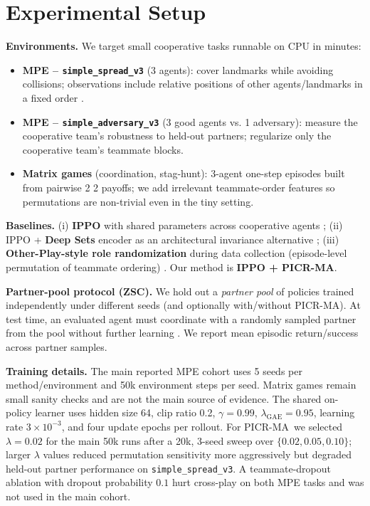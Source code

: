 \documentclass[nohyperref]{article}
\newcommand{\method}{PICR-MA} %
\begin{document}
\section{Experimental Setup}
\label{sec:setup}
\textbf{Environments.} We target small cooperative tasks runnable on CPU in minutes:
\begin{itemize}[leftmargin=*]
  \item \textbf{MPE -- \texttt{simple\_spread\_v3}} (3 agents): cover landmarks while avoiding collisions; observations include relative positions of other agents/landmarks in a fixed order \citep{terry2021pettingzoo}.
  \item \textbf{MPE -- \texttt{simple\_adversary\_v3}} (3 good agents vs. 1 adversary): measure the cooperative team’s robustness to held-out partners; regularize only the cooperative team’s teammate blocks.
  \item \textbf{Matrix games} (coordination, stag-hunt): 3-agent one-step episodes built from pairwise 2\,\texttimes\,2 payoffs; we add irrelevant teammate-order features so permutations are non-trivial even in the tiny setting.
\end{itemize}

\textbf{Baselines.} (i) \textbf{IPPO} with shared parameters across cooperative agents \citep{schulman2017ppo, terry2020ps}; (ii) IPPO + \textbf{Deep Sets} encoder as an architectural invariance alternative \citep{zaheer2017deepsets}; (iii) \textbf{Other-Play-style role randomization} during data collection (episode-level permutation of teammate ordering) \citep{hu2020otherplay}. Our method is \textbf{IPPO + \method}.

\textbf{Partner-pool protocol (ZSC).} We hold out a \emph{partner pool} of policies trained independently under different seeds (and optionally with/without \method). At test time, an evaluated agent must coordinate with a randomly sampled partner from the pool without further learning \citep{hu2020otherplay}. We report mean episodic return/success across partner samples.

\textbf{Training details.} The main reported MPE cohort uses 5 seeds per method/environment and 50k environment steps per seed. Matrix games remain small sanity checks and are not the main source of evidence. The shared on-policy learner uses hidden size 64, clip ratio 0.2, $\gamma{=}0.99$, $\lambda_{\mathrm{GAE}}{=}0.95$, learning rate $3\times 10^{-3}$, and four update epochs per rollout. For \method\ we selected $\lambda{=}0.02$ for the main 50k runs after a 20k, 3-seed sweep over $\{0.02, 0.05, 0.10\}$; larger $\lambda$ values reduced permutation sensitivity more aggressively but degraded held-out partner performance on \texttt{simple\_spread\_v3}. A teammate-dropout ablation with dropout probability $0.1$ hurt cross-play on both MPE tasks and was not used in the main cohort.
\end{document}
